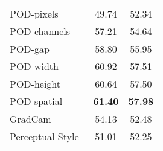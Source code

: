 \begin{table}[tb]
\begin{subtable}[t]{.42\textwidth}
\begin{tabular}{@{}lcc@{}}
            POD-pixels                                                 & 49.74          & 52.34          \\
            POD-channels                                               & 57.21          & 54.64          \\
            POD-gap                                                    & 58.80          & 55.95          \\
            POD-width                                                  & 60.92          & 57.51          \\
            POD-height                                                 & 60.64          & 57.50          \\
            POD-spatial                                                & \textbf{61.40} & \textbf{57.98} \\
            \cmidrule{1-3}
            GradCam~\cite{dhar2019learning_without_memorizing_gradcam} & 54.13          & 52.48          \\
            Perceptual Style~\cite{johnson2016perceptual_losses}       & 51.01          & 52.25          \\
            \bottomrule
        \end{tabular}
    \end{subtable}

\end{table}
\captionsetup[table]{skip=10pt}
